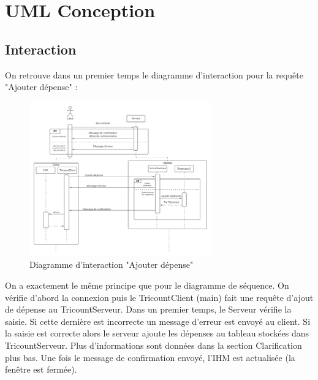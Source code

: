 \documentclass[12,french]{report}
\begin{document}
\chapter{UML Conception}

\section{Interaction}

On retrouve dans un premier temps le diagramme d'interaction pour la requête "Ajouter dépense" :

\begin{figure}[H]
	\center
	\includegraphics[width=0.7\textwidth]{./Images_pooa/Interaction_AjouterDepense}
	\caption{Diagramme d'interaction "Ajouter dépense"}
\end{figure}\vspace{0.2cm}

On a exactement le même principe que pour le diagramme de séquence. On vérifie d’abord la connexion puis le TricountClient (main) fait une requête d’ajout de dépense au TricountServeur. Dans un premier temps, le Serveur vérifie la saisie. Si cette dernière est incorrecte un message d'erreur est envoyé au client. Si la saisie est correcte alors le serveur ajoute les dépenses au tableau stockées dans TricountServeur. Plus d'informations sont données dans la section Clarification plus bas.
Une fois le message de confirmation envoyé, l'IHM est actualisée (la fenêtre est fermée). \\
\end{document}
